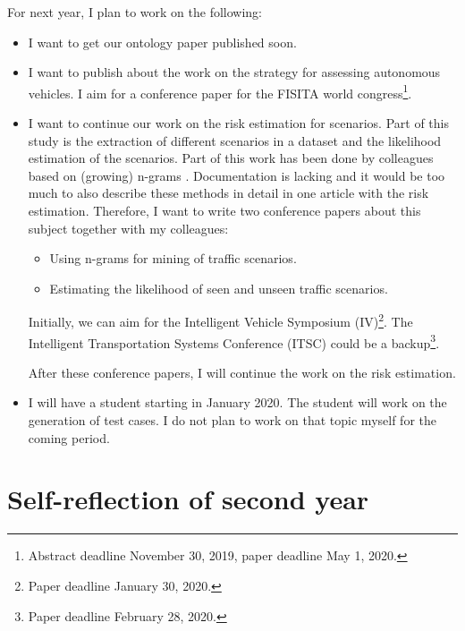 \documentclass[10pt,final,a4paper,oneside,onecolumn]{article}
\begin{document}
For next year, I plan to work on the following:
\begin{itemize}
	\item I want to get our ontology paper published soon.
	
	\item I want to publish about the work on the strategy for assessing autonomous vehicles. I aim for a conference paper for the FISITA world congress\footnote{Abstract deadline November 30, 2019, paper deadline May 1, 2020.}.
	
	\item I want to continue our work on the risk estimation for scenarios. Part of this study is the extraction of different scenarios in a dataset and the likelihood estimation of the scenarios. Part of this work has been done by colleagues based on (growing) n-grams \cite{kneser1995improved}. Documentation is lacking and it would be too much to also describe these methods in detail in one article with the risk estimation. Therefore, I want to write two conference papers about this subject together with my colleagues:
	\begin{itemize}
		\item Using n-grams for mining of traffic scenarios.
		\item Estimating the likelihood of seen and unseen traffic scenarios.
	\end{itemize}
	Initially, we can aim for the Intelligent Vehicle Symposium (IV)\footnote{Paper deadline January 30, 2020.}. The Intelligent Transportation Systems Conference (ITSC) could be a backup\footnote{Paper deadline February 28, 2020.}.
	
	After these conference papers, I will continue the work on the risk estimation.
	
	\item I will have a student starting in January 2020. The student will work on the generation of test cases. I do not plan to work on that topic myself for the coming period.
\end{itemize}



\section{Self-reflection of second year}
\label{sec:evaluation}
\end{document}
